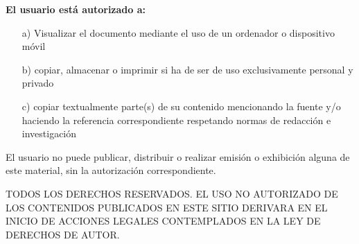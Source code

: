 \begin{flushleft}
    \textbf{El usuario está autorizado a:}

    
\end{flushleft}

\begin{enumerate}
    \item[a)] Visualizar el documento mediante el uso de un ordenador o dispositivo móvil

    \item[b)] copiar, almacenar o imprimir si ha de ser de uso exclusivamente personal y privado
    
    \item[c)] copiar textualmente parte(s) de su contenido mencionando la fuente y/o haciendo la referencia correspondiente respetando normas de redacción e investigación
\end{enumerate}

\begin{flushleft}
    El usuario no puede publicar, distribuir o realizar emisión o exhibición alguna de este material, sin la autorización correspondiente.\\[2cm]
\end{flushleft}


\begin{justify}
    TODOS LOS DERECHOS RESERVADOS. EL USO NO AUTORIZADO DE LOS CONTENIDOS PUBLICADOS EN ESTE SITIO DERIVARA EN EL INICIO DE ACCIONES LEGALES CONTEMPLADOS EN LA LEY DE DERECHOS DE AUTOR.
\end{justify}